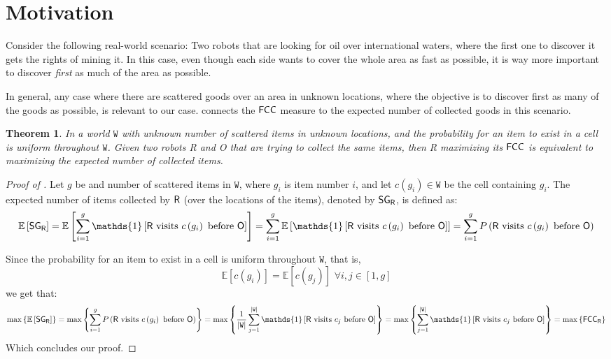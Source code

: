 \documentclass[a4paper,11pt]{article}
\newtheorem{theorem}{Theorem}
\theoremstyle{definition}
\newcommand{\rob}{{{\sf R}}\xspace}
\newcommand{\opp}{{{\sf O}}\xspace}
\newcommand{\w}{{{\texttt W}}\xspace}
\newcommand{\fcc}{{{\sf{FCC}}}\xspace}
\newcommand{\sg}{{\sf{SG}_{\rob}}}
\DeclarePairedDelimiter\abs{\lvert}{\rvert}%
\begin{document}
\section{Motivation}
Consider the following real-world scenario:
Two robots that are looking for oil over international waters, where the first one to discover it gets the rights of mining it. In this case, even though each side wants to cover the whole area as fast as possible, it is way more important to discover {\em first} as much of the area as possible.

In general, any case where there are scattered goods over an area in unknown locations, where the objective is to discover first as many of the goods as possible, is relevant to our case.  connects the $\fcc$ measure to the expected number of collected goods in this scenario.%

\begin{theorem}\label{theorems: motivation}
In a world $\w$ with unknown number of scattered items in unknown locations, and the probability for an item to exist in a cell is uniform throughout $\w$. Given two robots \rob and \opp that are trying to collect the same items, then %
\rob maximizing its $\fcc$ is equivalent to maximizing the expected number of collected items. %
\end{theorem}
\begin{proof}[Proof of ]
Let $g$ be and number of scattered items in $\w$, where $g_i$ is item number $i$, and let $c(g_i)\in\w$ be the cell containing $g_i$.
The expected number of items collected by $\rob$ (over the locations of the items), denoted by $\sg$, is defined as:
\begin{dmath*}[compact] 
    \mathbb{E}\left[\sg\right]=\mathbb{E}\left[\sum_{i=1}^{g}{\mathds{1}\left[\rob\text{ visits } c\left(g_i\right)\text{ before }\opp \right]}\right]
    = \sum_{i=1}^{g}{\mathbb{E}\left[\mathds{1}\left[\rob\text{ visits } c\left(g_i\right)\text{ before }\opp\right]\right]} = \sum_{i=1}^{g}{P\left(\rob\text{ visits } c\left(g_i\right)\text{ before }\opp\right)}
\end{dmath*}


Since the probability for an item to exist in a cell is uniform throughout $\w$, that is, \[\mathbb{E}\left[c\left(g_i\right)\right]=\mathbb{E}\left[c\left(g_j\right)\right] \,\,\forall i,j\in\left[1,g\right]\] we get that:
\begin{dmath*}[compact]
\max\left\{\mathbb{E}\left[\sg\right]\right\}=\max\left\{\sum_{i=1}^{g}{P\left(\rob\text{ visits } c\left(g_i\right)\text{ before }\opp \right)}\right\}
=\max\left\{\frac{1}{\abs*{\w}}\sum_{j=1}^{\abs*{\w}}{\mathds{1}\left[\rob \text{ visits } c_j \text{ before } \opp\right]}\right\}=\max\left\{\sum_{j=1}^{\abs*{\w}}{\mathds{1}\left[\rob \text{ visits } c_j \text{ before } \opp\right]}\right\}=\max\left\{\fcc_{\rob}\right\}
\end{dmath*}
Which concludes our proof.
\end{proof}
\end{document}
